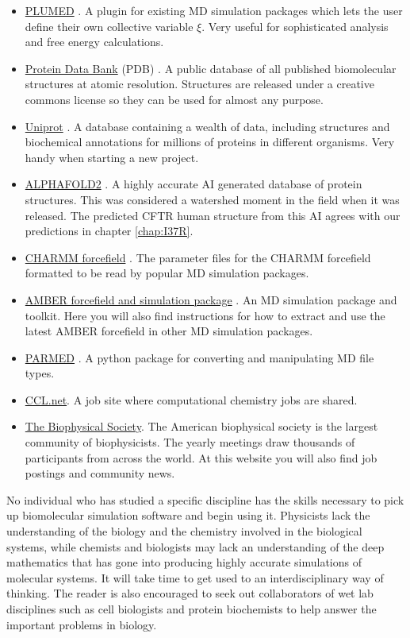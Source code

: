 \begin{itemize}
	\item \href{https://www.plumed.org/}{PLUMED} \cite{tribello2014}. A plugin for existing MD simulation packages which lets the user define their own collective variable $\xi$. Very useful for sophisticated analysis and free energy calculations. 
\item \href{https://www.rcsb.org/}{Protein Data Bank} (PDB) \cite{berman2000}. A public database of all published biomolecular structures at atomic resolution. Structures are released under a creative commons license so they can be used for almost any purpose.
	\item \href{https://www.uniprot.org/}{Uniprot} \cite{theuniprotconsortium2021}. A database containing a wealth of data, including structures and biochemical annotations for millions of proteins in different organisms. Very handy when starting a new project.
	\item \href{https://alphafold.ebi.ac.uk/}{ALPHAFOLD2} \cite{jumper2021}. A highly accurate AI generated database of protein structures. This was considered a watershed moment in the field when it was released. The predicted CFTR human structure from this AI agrees with our predictions in chapter \ref{chap:I37R}.
	\item \href{http://mackerell.umaryland.edu/charmm_ff.shtml}{CHARMM forcefield} \cite{huang2016}. The parameter files for the CHARMM forcefield formatted to be read by popular MD simulation packages.
	\item \href{https://ambermd.org/AmberModels.php}{AMBER forcefield and simulation package} \cite{amber22, ponder2003}. An MD simulation package and toolkit. Here you will also  find instructions for how to extract and use the latest AMBER forcefield in other MD simulation packages.
	\item \href{https://parmed.github.io/ParmEd/html/index.html}{PARMED} \cite{shirts2017}. A python package for converting and manipulating MD file types.
	\item \href{http://www.ccl.net/jobs/} {CCL.net}. A job site where computational chemistry jobs are shared. 
	\item \href{https://www.biophysics.org/} {The Biophysical Society}. The American biophysical society is the largest community of biophysicists. The yearly meetings draw thousands of participants from across the world. At this website you will also find job postings and community news.
\end{itemize}

No individual who has studied a specific discipline has the skills necessary to pick up biomolecular simulation software and begin using it. Physicists lack the understanding of the biology and the chemistry involved in the biological systems, while chemists and biologists may lack an understanding of the deep mathematics that has gone into producing highly accurate simulations of molecular systems. It will take time to get used to an interdisciplinary way of thinking. The reader is also encouraged to seek out collaborators of wet lab disciplines such as cell biologists and protein biochemists to help answer the important problems in biology.
